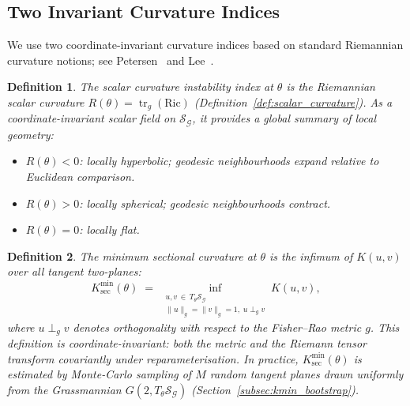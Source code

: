 \documentclass[a4paper,fleqn]{cas-dc}
\newtheorem{definition}{Definition}
\DeclareMathOperator{\tr}{tr}
\newcommand{\calS}{\mathcal{S}}
\newcommand{\calG}{\mathcal{G}}
\begin{document}
\subsection{Two Invariant Curvature Indices}

We use two coordinate-invariant curvature indices based on standard
Riemannian curvature notions; see Petersen~\cite{petersen2016riemannian}
and Lee~\cite{lee2006riemannian}. 

\begin{definition}%
  \label{def:scalar_instability}
  The \emph{scalar curvature instability index} at $\theta$ is the
  Riemannian scalar curvature $R(\theta) = \tr_g(\mathrm{Ric})$
  (Definition~\ref{def:scalar_curvature}).
  As a coordinate-invariant scalar field on $\calS_{\calG}$, it provides
  a global summary of local geometry:
  \begin{itemize}
    \item $R(\theta) < 0$: locally hyperbolic; geodesic neighbourhoods
          expand relative to Euclidean comparison.
    \item $R(\theta) > 0$: locally spherical; geodesic neighbourhoods
          contract.
    \item $R(\theta) = 0$: locally flat.
  \end{itemize}
\end{definition}

\begin{definition}%
  \label{def:min_sectional}
  The \emph{minimum sectional curvature} at $\theta$ is the infimum of
  $K(u,v)$ over all tangent two-planes:
  \begin{equation}
    K_{\sec}^{\min}(\theta)
    \;=\; \inf_{\substack{u,v\,\in\, T_\theta\calS_{\calG} \\
                          \|u\|_g=\|v\|_g=1,\;u\perp_g v}}
          K(u,v),
    \label{eq:min_sectional}
  \end{equation}
  where $u\perp_g v$ denotes orthogonality with respect to the Fisher--Rao
  metric $g$.
  This definition is coordinate-invariant: both the metric and the
  Riemann tensor transform covariantly under reparameterisation.
  In practice, $K_{\sec}^{\min}(\theta)$ is estimated by Monte-Carlo
  sampling of $M$ random tangent planes drawn uniformly from the
  Grassmannian $G(2, T_\theta\calS_{\calG})$
  (Section~\ref{subsec:kmin_bootstrap}).
\end{definition}
\end{document}
